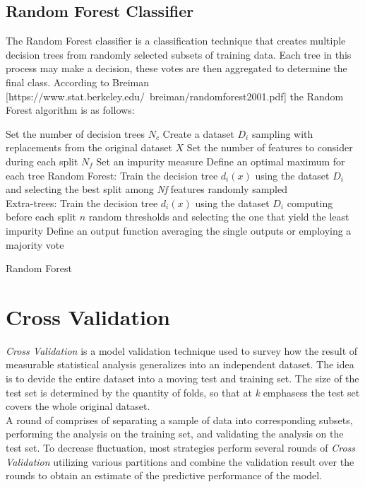 \documentclass[a4paper, 11pt,titlepage,oneside,openany]{book}
\begin{document}
\subsection{Random Forest Classifier}
The Random Forest classifier is a classification technique that creates multiple decision trees from randomly selected subsets of training data. Each tree in this process may make a decision, these votes are then aggregated to determine the final class. According to Breiman [https://www.stat.berkeley.edu/~breiman/randomforest2001.pdf] the Random Forest algorithm is as follows:\\
\noindent
\begin{algorithm}[H]
	\DontPrintSemicolon
	Set the number of decision trees $N_c$\;
		{Create a dataset $D_i$ sampling with replacements from the original dataset $X$}
	Set the number of features  to consider during each split $N_f$\;
	Set an impurity measure\;
	Define an optimal maximum for each tree\;
		{Random Forest: Train the decision tree $d_i(x)$ using the dataset $D_i$ and selecting the best split among \textit{Nf} features randomly sampled \\
		Extra-trees:  Train the decision tree $d_i(x)$ using the dataset $D_i$ computing before each split $n$ random thresholds and selecting the one that yield the least impurity}
	Define an output function averaging the single outputs or employing a majority vote
	\caption{Random Forest}
\end{algorithm}
\section{Cross Validation}
\textit{Cross Validation} is a model validation technique used to survey how the result of measurable statistical analysis generalizes into an independent dataset. The idea is to devide the entire dataset into a moving test and training set. The size of the test set is determined by the quantity of folds, so that at \textit{k} emphasess the test set covers the whole original dataset.\\
\noindent A round of  comprises of separating a sample of data into corresponding subsets, performing the analysis on the training set, and validating the analysis on the test set. To decrease fluctuation, most strategies perform several rounds of \textit{Cross Validation} utilizing various partitions and combine the validation result over the rounds to obtain an estimate of the predictive performance of the model.
\end{document}
